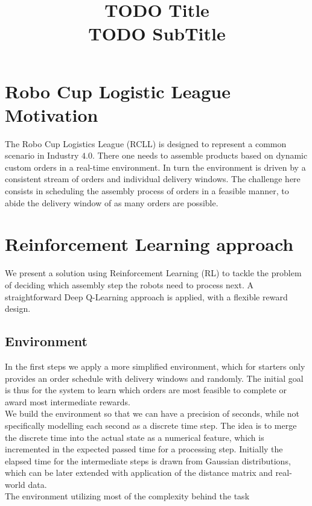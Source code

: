 \documentclass[runningheads,envcountsect]{llncs}
\title{{\huge TODO Title}\\{\LARGE \vspace{4pt} TODO SubTitle}}
\author{}
\institute{}
\begin{document}
\maketitle

\section{Robo Cup Logistic League Motivation}
The Robo Cup Logistics League (RCLL) is designed to represent a common scenario in Industry $4.0$. There one needs to assemble products based on dynamic custom orders in a real-time environment. In turn the environment is driven by a consistent stream of orders and individual delivery windows. The challenge here consists in scheduling the assembly process of orders in a feasible manner, to abide the delivery window of as many orders are possible.

\section{Reinforcement Learning approach}
We present a solution using Reinforcement Learning (RL) to tackle the problem of deciding which assembly step the robots need to process next. A straightforward Deep Q-Learning approach is applied, with a flexible reward design.


\subsection{Environment}
In the first steps we apply a more simplified environment, which for starters only provides an order schedule with delivery windows and randomly. The initial goal is thus for the system to learn which orders are most feasible to complete or award most intermediate rewards.\\
We build the environment so that we can have a precision of seconds, while not specifically modelling each second as a discrete time step. The idea is to merge the discrete time into the actual state as a numerical feature, which is incremented in the expected passed time for a processing step. Initially the elapsed time for the intermediate steps is drawn from Gaussian distributions, which can be later extended with application of the distance matrix and real-world data.\\
The environment utilizing most of the complexity behind the task 
\end{document}

